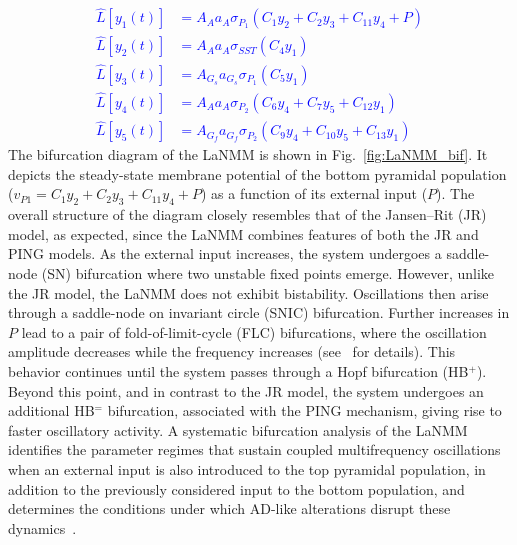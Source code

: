 \documentclass[12pt]{article}
\numberwithin{equation}{section}
\newcommand{\rev}[1]{\begingroup\color{navyblue}#1\endgroup}
\begin{document}
\textcolor{blue}{
\begin{align}
\hat{L} [y_1(t)] &= A_A a_A \sigma_{P_1}(C_1y_{2} + C_2y_{3} + C_{11}y_{4} + P)\\
\hat{L} [y_2(t)] &= A_A a_A \sigma_{SST}(C_4y_{1})\\
\hat{L} [y_3(t)] &= A_{G_s} a_{G_s} \sigma_{P_1}(C_5y_{1})\\
\hat{L} [y_4(t)] &= A_{A} a_A \sigma_{P_2}(C_6y_{4} +  C_7y_{5} +  C_{12}y_{1})\\
\hat{L} [y_5(t)] &= A_{G_f} a_{G_f} \sigma_{P_2}(C_9y_{4} +  C_{10}y_{5} +  C_{13}y_{1} )
\label{eq:nmm1-lanmm}
\end{align}}
\rev{
The bifurcation diagram of the LaNMM is shown in Fig.~\ref{fig:LaNMM_bif}. It depicts the steady-state membrane potential of the bottom pyramidal population ($v_{P1} = C_1y_{2} + C_2y_{3} + C_{11}y_{4} + P$) as a function of its external input ($P$). The overall structure of the diagram closely resembles that of the Jansen--Rit (JR) model, as expected, since the LaNMM combines features of both the JR and PING models. As the external input increases, the system undergoes a saddle-node (SN) bifurcation where two unstable fixed points emerge. However, unlike the JR model, the LaNMM does not exhibit bistability. Oscillations then arise through a saddle-node on invariant circle (SNIC) bifurcation. Further increases in $P$ lead to a pair of fold-of-limit-cycle (FLC) bifurcations, where the oscillation amplitude decreases while the frequency increases (see~\cite{depalmaaristidesEmergenceMultifrequencyActivity2025} for details). This behavior continues until the system passes through a Hopf bifurcation (HB$^{+}$). Beyond this point, and in contrast to the JR model, the system undergoes an additional HB$^{=}$ bifurcation, associated with the PING mechanism, giving rise to faster oscillatory activity. A systematic bifurcation analysis of the LaNMM identifies the parameter regimes that sustain coupled multifrequency oscillations when an external input is also introduced to the top pyramidal population, in addition to the previously considered input to the bottom population, and determines the conditions under which AD-like alterations disrupt these dynamics~\cite{depalmaaristidesEmergenceMultifrequencyActivity2025}.}
\end{document}
